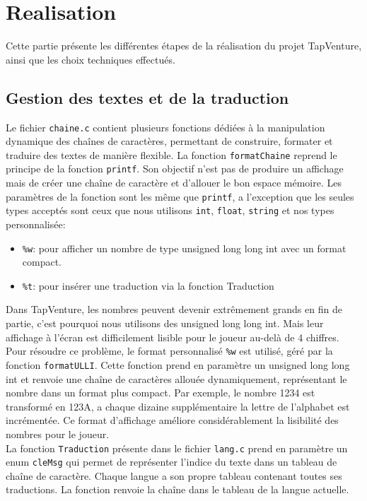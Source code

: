 \documentclass[11pt,a4paper]{article}
\begin{document}
\section{Realisation}
Cette partie présente les différentes étapes de la réalisation du projet TapVenture, ainsi que les choix techniques effectués.
\subsection{Gestion des textes et de la traduction}
Le fichier \texttt{chaine.c} contient plusieurs fonctions dédiées à la manipulation dynamique des chaînes de caractères, permettant de construire, formater et traduire des textes de manière flexible.
La fonction \texttt{formatChaine} reprend le principe de la fonction \texttt{printf}. Son objectif n’est pas de produire un affichage mais de créer une chaîne de caractère et d'allouer le bon espace mémoire. Les paramètres de la fonction sont les même que \texttt{printf}, a l’exception que les seules types acceptés sont ceux que nous utilisons \texttt{int}, \texttt{float}, \texttt{string} et nos types personnalisée:

\begin{itemize}
    \item \texttt{\%w}: pour afficher un nombre de type unsigned long long int avec un format compact.
 	\item \texttt{\%t}: pour insérer une traduction via la fonction Traduction
\end{itemize}

Dans TapVenture, les nombres peuvent devenir extrêmement grands en fin de partie, c'est pourquoi nous utilisons des unsigned long long int. Mais leur affichage à l'écran est difficilement lisible pour le joueur au-delà de 4 chiffres. Pour résoudre ce problème, le format personnalisé \texttt{\%w} est utilisé, géré par la fonction \texttt{formatULLI}. Cette fonction prend en paramètre un unsigned long long int et renvoie une chaîne de caractères allouée dynamiquement, représentant le nombre dans un format plus compact. Par exemple, le nombre 1234 est transformé en 123A, a chaque dizaine supplémentaire la lettre de l'alphabet est incrémentée. Ce format d'affichage améliore considérablement la lisibilité des nombres pour le joueur.\\
La fonction \texttt{Traduction} présente dans le fichier \texttt{lang.c} prend en paramètre un enum \texttt{cleMsg} qui permet de représenter l’indice du texte dans un tableau de chaîne de caractère. Chaque langue a son propre tableau contenant toutes ses traductions. La fonction renvoie la chaîne dans le tableau de la langue actuelle.  
\end{document}
